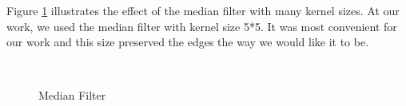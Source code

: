 Figure \ref{fig:fig8} illustrates the effect of the median filter with many kernel sizes. At our 
work, we used the median filter with kernel size 5*5. It was most convenient for our work and 
this size preserved the edges the way we would like it to be. 
\begin{figure}[h]
\begin{dBox}
\centering
  \mbox{
   }
   \caption{Median Filter \label{fig:fig8} }   
\end{dBox}   
\end{figure}

